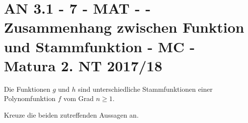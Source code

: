 \section{AN 3.1 - 7 - MAT - - Zusammenhang zwischen Funktion und Stammfunktion - MC - Matura 2. NT 2017/18}

\begin{beispiel}[AN 3.1]{1}
Die Funktionen $g$ und $h$ sind unterschiedliche Stammfunktionen einer Polynomfunktion $f$ vom Grad $n \geq 1$.

Kreuze die beiden zutreffenden Aussagen an.

\end{beispiel}